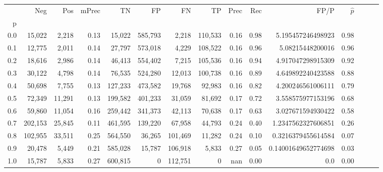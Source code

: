 \begin{tabular}{rrrrrrrrrrrrrrr}
\toprule
{} &      Neg &     Pos & mPrec &       TN &       FP &       FN &       TP &  Prec &   Rec &                 FP/P & $\hat{p}$ \\
p   &          &         &       &          &          &          &          &       &       &                      &           \\
\midrule
0.0 &   15,022 &   2,218 &  0.13 &   15,022 &  585,793 &    2,218 &  110,533 &  0.16 &  0.98 &    5.195457246498923 &      0.98 \\
0.1 &   12,775 &   2,011 &  0.14 &   27,797 &  573,018 &    4,229 &  108,522 &  0.16 &  0.96 &     5.08215448200016 &      0.96 \\
0.2 &   18,616 &   2,986 &  0.14 &   46,413 &  554,402 &    7,215 &  105,536 &  0.16 &  0.94 &    4.917047298915309 &      0.92 \\
0.3 &   30,122 &   4,798 &  0.14 &   76,535 &  524,280 &   12,013 &  100,738 &  0.16 &  0.89 &    4.649892240423588 &      0.88 \\
0.4 &   50,698 &   7,755 &  0.13 &  127,233 &  473,582 &   19,768 &   92,983 &  0.16 &  0.82 &    4.200246561006111 &      0.79 \\
0.5 &   72,349 &  11,291 &  0.13 &  199,582 &  401,233 &   31,059 &   81,692 &  0.17 &  0.72 &    3.558575977153196 &      0.68 \\
0.6 &   59,860 &  11,054 &  0.16 &  259,442 &  341,373 &   42,113 &   70,638 &  0.17 &  0.63 &    3.027671594930422 &      0.58 \\
0.7 &  202,153 &  25,845 &  0.11 &  461,595 &  139,220 &   67,958 &   44,793 &  0.24 &  0.40 &   1.2347562327606851 &      0.26 \\
0.8 &  102,955 &  33,511 &  0.25 &  564,550 &   36,265 &  101,469 &   11,282 &  0.24 &  0.10 &   0.3216379455614584 &      0.07 \\
0.9 &   20,478 &   5,449 &  0.21 &  585,028 &   15,787 &  106,918 &    5,833 &  0.27 &  0.05 &  0.14001649652774698 &      0.03 \\
1.0 &   15,787 &   5,833 &  0.27 &  600,815 &        0 &  112,751 &        0 &   nan &  0.00 &                  0.0 &      0.00 \\
\bottomrule
\end{tabular}
